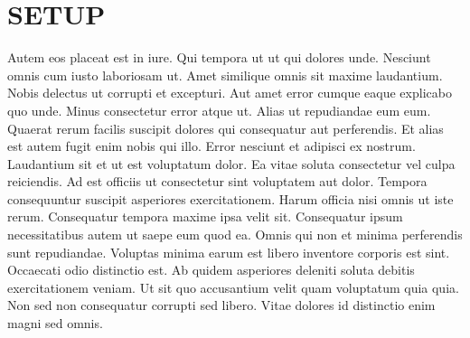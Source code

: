 \documentclass[
	11pt, %
	fleqn, %
	letterpaper, %
]{CommodoreBlueBook}
\begin{document}
\cleardoublepage %


\pagestyle{empty} %

\setcounter{tocdepth}{1}
\tableofcontents %

% 

\pagestyle{fancy} %

\cleardoublepage %


\section*{SETUP}


Autem eos placeat est in iure. Qui tempora ut ut qui dolores unde. Nesciunt
omnis cum iusto laboriosam ut. Amet similique omnis sit maxime laudantium.
Nobis delectus ut corrupti et excepturi. Aut amet error cumque eaque explicabo
quo unde. Minus consectetur error atque ut. Alias ut repudiandae eum eum.
Quaerat rerum facilis suscipit dolores qui consequatur aut perferendis. Et
alias est autem fugit enim nobis qui illo. Error nesciunt et adipisci ex
nostrum. Laudantium sit et ut est voluptatum dolor. Ea vitae soluta consectetur
vel culpa reiciendis. Ad est officiis ut consectetur sint voluptatem aut dolor.
Tempora consequuntur suscipit asperiores exercitationem. Harum officia nisi
omnis ut iste rerum. Consequatur tempora maxime ipsa velit sit. Consequatur
ipsum necessitatibus autem ut saepe eum quod ea. Omnis qui non et minima
perferendis sunt repudiandae. Voluptas minima earum est libero inventore
corporis est sint. Occaecati odio distinctio est. Ab quidem asperiores deleniti
soluta debitis exercitationem veniam. Ut sit quo accusantium velit quam
voluptatum quia quia. Non sed non consequatur corrupti sed libero. Vitae
dolores id distinctio enim magni sed omnis.
\end{document}
